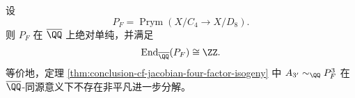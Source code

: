 

\begin{conjecture}\label{conj:conclusion-cf-prym9-absolute-simplicity}
设
\[
P_F=\operatorname{Prym}(X/C_4\to X/D_8).
\]
则 \(P_F\) 在 \(\overline{\QQ}\) 上绝对单纯，并满足
\[
\operatorname{End}_{\overline{\QQ}}(P_F)\cong \ZZ.
\]
等价地，定理 \ref{thm:conclusion-cf-jacobian-four-factor-isogeny} 中
\(
A_{3'}\sim_{\QQ}P_F^3
\)
在 \(\overline{\QQ}\)-同源意义下不存在非平凡进一步分解。
\end{conjecture}
